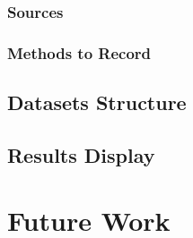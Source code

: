 \documentclass[senior]{IPSstyle}
\begin{document}
\subsection{Sources}
\subsection{Methods to Record}
\section{Datasets Structure}
\section{Results Display}

\chapter{Future Work}\label{future work}



\end{document}
